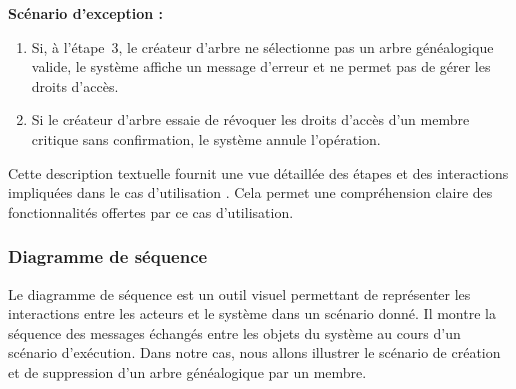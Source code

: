 \textbf{Scénario d'exception :}
\begin{enumerate}
  \item Si, à l’étape 3, le créateur d'arbre ne sélectionne pas un arbre généalogique
    valide, le système affiche un message d'erreur et ne permet pas de gérer les droits d'accès.

  \item Si le créateur d'arbre essaie de révoquer les droits d'accès d'un membre
    critique sans confirmation, le système annule l'opération.
\end{enumerate}

Cette description textuelle fournit une vue détaillée des étapes et des
interactions impliquées dans le cas d’utilisation .
Cela permet une compréhension claire des fonctionnalités offertes par ce cas d’utilisation.


\subsubsection{Diagramme de séquence}

Le diagramme de séquence est un outil visuel permettant de représenter les
interactions entre les acteurs et le système dans un scénario donné. Il montre
la séquence des messages échangés entre les objets du système au cours d’un
scénario d’exécution. Dans notre cas, nous allons illustrer le scénario de
création et de suppression d’un arbre généalogique par un membre.


